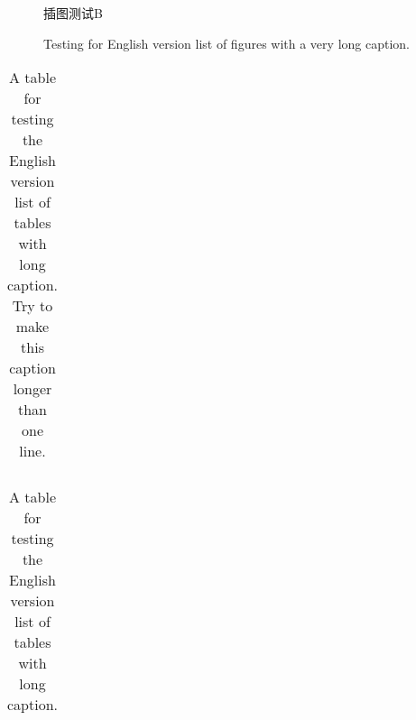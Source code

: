 \begin{figure}
  \centering
  
  \caption{插图测试B}
  \label{fig:test:b}
\end{figure}


\begin{figure}
  \centering
  
  \caption{Testing for English version list of figures with a very long caption.}
  \label{fig:test:english}
\end{figure}


\begin{table}
  \centering
  \begin{tabular}{cc}
    
  \end{tabular}
  \caption{A table for testing the English version list of tables with long
    caption. Try to make this caption longer than one line.}
  \label{tab:test:english}
\end{table}


\begin{table}
  \centering
  \begin{tabular}{cc}
    
  \end{tabular}
  \caption[Short table caption]{A table for testing the English version list of
    tables with long caption.}
  \label{tab:test:eng-short}
\end{table}


